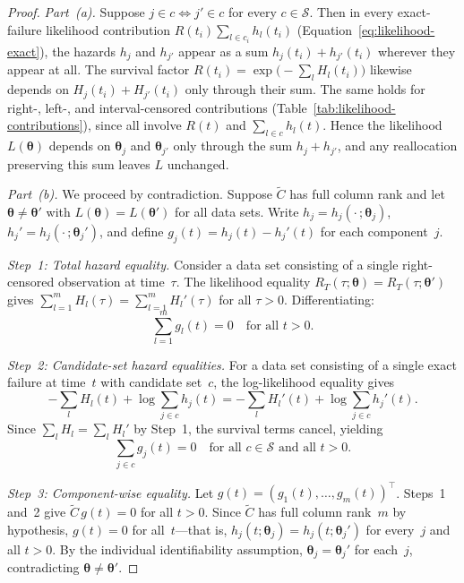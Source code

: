 \documentclass[11pt]{article}
\theoremstyle{definition}
\theoremstyle{plain}
\renewcommand{\v}[1]{\boldsymbol{#1}}
\begin{document}
\begin{proof}
\emph{Part~(a).}
Suppose $j \in c \iff j' \in c$ for every $c \in \mathcal{S}$.
Then in every exact-failure likelihood contribution
$R(t_i) \sum_{l \in c_i} h_l(t_i)$
(Equation~\ref{eq:likelihood-exact}),
the hazards $h_j$ and $h_{j'}$ appear as a sum
$h_j(t_i) + h_{j'}(t_i)$ wherever they appear at all.
The survival factor
$R(t_i) = \exp\bigl(-\sum_l H_l(t_i)\bigr)$ likewise depends on
$H_j(t_i) + H_{j'}(t_i)$ only through their sum.
The same holds for right-, left-, and interval-censored
contributions (Table~\ref{tab:likelihood-contributions}),
since all involve $R(t)$ and $\sum_{l \in c} h_l(t)$.
Hence the likelihood $L(\v{\theta})$ depends on $\v{\theta}_j$ and
$\v{\theta}_{j'}$ only through the sum $h_j + h_{j'}$, and any
reallocation preserving this sum leaves $L$ unchanged.

\emph{Part~(b).}
We proceed by contradiction.
Suppose $\tilde{C}$ has full column rank and let
$\v{\theta} \neq \v{\theta}'$ with $L(\v{\theta}) = L(\v{\theta}')$
for all data sets.
Write $h_j = h_j(\cdot\,; \v{\theta}_j)$,
$h_j' = h_j(\cdot\,; \v{\theta}_j')$, and define
$g_j(t) = h_j(t) - h_j'(t)$ for each component~$j$.

\emph{Step~1: Total hazard equality.}
Consider a data set consisting of a single right-censored observation
at time~$\tau$.
The likelihood equality
$R_{T}(\tau; \v{\theta}) = R_{T}(\tau; \v{\theta}')$ gives
$\sum_{l=1}^m H_l(\tau) = \sum_{l=1}^m H_l'(\tau)$ for all
$\tau > 0$.
Differentiating:
\begin{equation}
\label{eq:total-hazard-eq}
    \sum_{l=1}^m g_l(t) = 0
    \quad \text{for all } t > 0.
\end{equation}

\emph{Step~2: Candidate-set hazard equalities.}
For a data set consisting of a single exact failure at time~$t$ with
candidate set~$c$, the log-likelihood equality gives
\begin{equation}
\label{eq:ident-proof}
    -\sum_l H_l(t) + \log \sum_{j \in c} h_j(t)
    = -\sum_l H_l'(t) + \log \sum_{j \in c} h_j'(t).
\end{equation}
Since $\sum_l H_l = \sum_l H_l'$ by Step~1, the survival terms
cancel, yielding
\begin{equation}
\label{eq:candidate-eq}
    \sum_{j \in c} g_j(t) = 0
    \quad \text{for all } c \in \mathcal{S} \text{ and all } t > 0.
\end{equation}

\emph{Step~3: Component-wise equality.}
Let $g(t) = (g_1(t), \ldots, g_m(t))^\top$.
Steps~1 and~2 give $\tilde{C} \, g(t) = 0$ for all $t > 0$.
Since $\tilde{C}$ has full column rank~$m$ by hypothesis,
$g(t) = 0$ for all~$t$---that is,
$h_j(t; \v{\theta}_j) = h_j(t; \v{\theta}_j')$ for every~$j$ and
all $t > 0$.
By the individual identifiability assumption,
$\v{\theta}_j = \v{\theta}_j'$ for each~$j$, contradicting
$\v{\theta} \neq \v{\theta}'$.
\end{proof}
\end{document}
